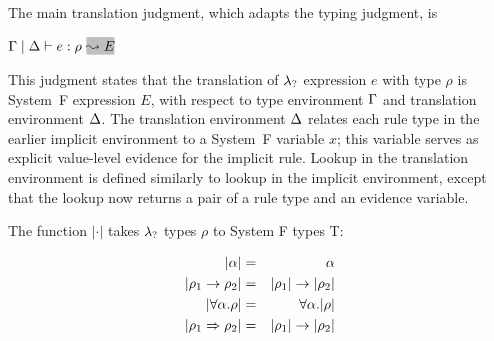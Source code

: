 The main translation judgment, which adapts the typing judgment, is 
\begin{center}
  $\tenv \mid \denv \turns \relation{e}{\rho}~\gbox{\leadsto E}$
\end{center}
This judgment states that the translation of $\lambda_{?}$ expression $e$ with
type $\rho$ is System~F expression $E$, with respect to type environment
$\Gamma$ and translation
environment $\Delta$. The translation environment $\Delta$ relates each
rule type in the earlier implicit environment to a System~F variable
$x$; %
this
variable serves as explicit value-level evidence for the implicit rule.
Lookup
in the translation environment is defined similarly to lookup in the
implicit environment, except that the lookup now returns a pair of a rule type
and an evidence variable.

The function $|\cdot|$ takes 
$\lambda_{?}$ types $\rho$ to System F types T: 
\begin{center}
\colorbox{light}{\parbox{0.3\textwidth}{\begin{eqnarray*}
|\alpha| & = & \alpha \\
|\rulet_1 \arrow \rulet_2| & = & |\rulet_1| \arrow |\rulet_2| \\
|\forall \alpha. \rulet| & = & \forall \alpha. |\rulet| \\
|\rulet_1 \iarrow \rulet_2| & = & |\rulet_1| \arrow |\rulet_2| %
\end{eqnarray*}
}}
\end{center}




